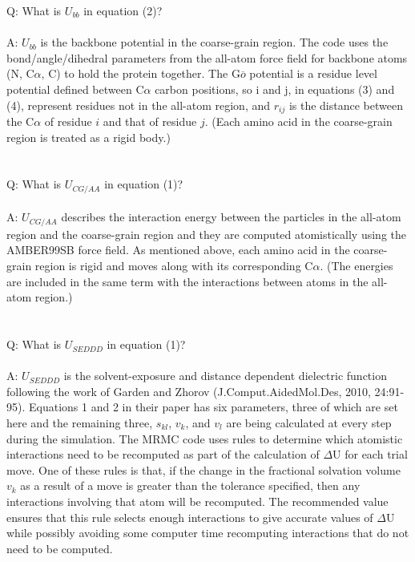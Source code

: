 \documentclass{article}      %
\begin{document}
Q:  What is $U_{bb}$ in equation (2)?
\\\\
A: $U_{bb}$ is the backbone potential in the coarse-grain region. The code uses the bond/angle/dihedral parameters from the all-atom force field for backbone atoms (N, C$\alpha$, C) to hold the protein together. The G$\overline{o}$ potential is a residue level potential defined between C$\alpha$ carbon positions, so i and j, in equations (3) and (4), represent residues not in the all-atom region, and $r_{ij}$ is the distance between the C$\alpha$ of residue $i$ and that of residue $j$.  (Each amino acid in the coarse-grain region is treated as a rigid body.)
\\\\\\
Q:  What is $U_{CG/AA}$ in equation (1)?
\\\\
A:  $U_{CG/AA}$ describes the interaction energy between the particles in the all-atom region and the coarse-grain region and they are computed atomistically using the AMBER99SB force field.  As mentioned above, each amino acid in the coarse-grain region is rigid and moves along with its corresponding C$\alpha$. (The energies are included in the same term with the interactions between atoms in the all-atom region.)  
\\\\\\
Q:  What is $U_{SEDDD}$ in equation (1)?
\\\\
A:  $U_{SEDDD}$ is the solvent-exposure and distance dependent dielectric function following the work of Garden and Zhorov (J.Comput.AidedMol.Des, 2010, 24:91-95). Equations 1 and 2 in their paper has six parameters, three of which are set here and the remaining three, $s_{kl}$, $v_{k}$, and $v_{l}$ are being calculated at every step during the simulation. The MRMC code uses rules to determine which atomistic interactions need to be recomputed as part of the calculation of $\Delta$U for each trial move. One of these rules is that, if the change in the fractional solvation volume $v_{k}$ as a result of a move is greater than the tolerance specified, then any interactions involving that atom will be recomputed. The recommended value ensures that this rule selects enough interactions to give accurate values of $\Delta$U while possibly avoiding some computer time recomputing interactions that do not need to be computed.  
\\\\\\
\end{document}
